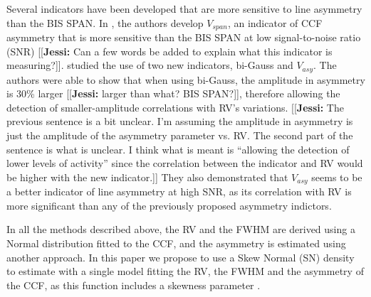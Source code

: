 \documentclass[11pt, oneside]{article}
\newcommand{\jessi}[1]{{\color{Purple}[[\textbf{Jessi: }#1]]}}
\begin{document}
Several indicators have been developed that are more sensitive to line asymmetry than the BIS SPAN. In \citet{Boisse-2011}, the authors develop $V_{span}$, an indicator of CCF asymmetry that is more sensitive than the BIS SPAN at low signal-to-noise ratio (SNR) \jessi{Can a few words be added to explain what this indicator is measuring?}. 
%
\citet{Figueira-2013} studied the use of two new indicators, bi-Gauss and $V_{asy}$. The authors were able to show that when using bi-Gauss, the amplitude in asymmetry is 30\% larger \jessi{larger than what?  BIS SPAN?}, therefore allowing the detection of smaller-amplitude correlations with RV's variations. \jessi{The previous sentence is a bit unclear.  I'm assuming the amplitude in asymmetry is just the amplitude of the asymmetry parameter vs. RV.  The second part of the sentence is what is unclear.  I think what is meant is ``allowing the detection of lower levels of activity'' since the correlation between the indicator and RV would be higher with the new indicator.}
They also demonstrated that $V_{asy}$ seems to be a better indicator of line asymmetry at high SNR, as its correlation with RV is more significant than any of the previously proposed asymmetry indictors.

In all the methods described above, the RV and the FWHM are derived using a Normal distribution fitted to the CCF, and the asymmetry is estimated using another approach. 
%
In this paper we propose to use a Skew Normal (SN) density to estimate with a single model fitting the RV, the FWHM and the asymmetry of the CCF, as this function includes a skewness parameter \citep[][]{Azzalini1985}. 

\end{document}
